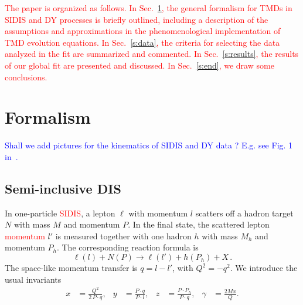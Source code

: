 \documentclass[aps,preprintnumbers,showpacs,nofootinbib,superscriptaddress,floatfix]{revtex4}
\begin{document}
\textcolor{red}{The paper is organized as follows. In Sec.~\ref{s:theory}, the general formalism for TMDs in SIDIS and DY processes is briefly outlined, including a description of the assumptions and approximations in the phenomenological implementation of TMD evolution equations. In Sec.~\ref{s:data}, the criteria for selecting the data analyzed in the fit are summarized and commented. In Sec.~\ref{s:results}, the results of our global fit are presented and discussed. In Sec.~\ref{s:end}, we draw some conclusions. }
   

\section{Formalism}
\label{s:theory}

\textcolor{blue}{Shall we add pictures for the kinematics of SIDIS and DY data ? E.g. see Fig. 1 in~\cite{Signori:2013mda}.}

\subsection{Semi-inclusive DIS}
\label{ss:SIDIS_formalism}

In one-particle \textcolor{red}{SIDIS}, a lepton $\ell$ with momentum $l$ scatters 
off a hadron target $N$ with mass $M$ and momentum
$P$. In the final state, the scattered lepton \textcolor{red}{momentum} $l'$ is measured together with
one hadron $h$ with mass $M_h$
and momentum $P_h$. The corresponding reaction formula is  
\begin{equation}
  \label{e:sidis}
\ell(l) + N(P) \to \ell(l') + h(P_h) + X \, .
\end{equation}
The space-like momentum transfer is $q = l - l'$, with $Q^2 = - q^2$. We
introduce the usual invariants  
\begin{align}
  \label{e:xyz}
x &= \frac{Q^2}{2\,P\cdot q},
&
y &= \frac{P \cdot q}{P \cdot l},
&
z &= \frac{P \cdot P_h}{P\cdot q},
&
\gamma &= \frac{2 M x}{Q} .
\end{align}
\end{document}

